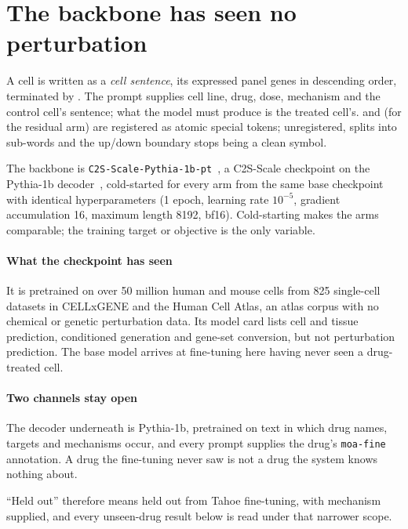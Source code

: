\section{The backbone has seen no perturbation}

A cell is written as a \emph{cell sentence}, its expressed panel genes in
descending order, terminated by \ENDCELL. The prompt supplies cell line, drug,
dose, mechanism and the control cell's sentence; what the model must produce is
the treated cell's. \ENDCELL{} and (for the residual arm) \DOWN{} are registered
as atomic special tokens; unregistered, \DOWN{} splits into sub-words and the
up/down boundary stops being a clean symbol.

The backbone is \texttt{C2S-Scale-Pythia-1b-pt}~\cite{c2sscale}, a C2S-Scale
checkpoint on the Pythia-1b decoder~\cite{pythia}, cold-started for every arm
from the same base checkpoint with identical hyperparameters (1 epoch, learning
rate $10^{-5}$, gradient accumulation 16, maximum length 8192,
bf16). Cold-starting
makes the arms comparable; the training target or objective is the only
variable.

\paragraph{What the checkpoint has seen} It is pretrained on over 50 million
human and mouse cells from 825 single-cell datasets in CELLxGENE and the Human
Cell Atlas, an atlas corpus with no chemical or genetic perturbation data. Its
model card lists cell and tissue prediction, conditioned generation and gene-set
conversion, but not perturbation prediction. The base model arrives at
fine-tuning here having never seen a drug-treated cell.

\paragraph{Two channels stay open} The decoder underneath is Pythia-1b,
pretrained on text in which drug names, targets and mechanisms occur, and every
prompt supplies the drug's \texttt{moa-fine} annotation. A drug the fine-tuning
never saw is not a drug the system knows nothing about.

\begin{scopelimit}
``Held out'' therefore means held out from Tahoe fine-tuning, with mechanism
supplied, and every unseen-drug result below is read under that narrower scope.
\end{scopelimit}

